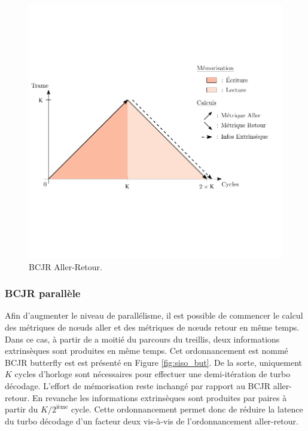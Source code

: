 \begin{figure}[!h]
	\centering
	\includegraphics{main/ch4_fig/ipe/FB+LEG.pdf}
	\caption{BCJR Aller-Retour. \label{fig:siso_seq}}
\end{figure}

\subsubsection{BCJR parallèle}
Afin d'augmenter le niveau de parallélisme, il est possible de commencer le calcul des métriques de nœuds aller et des
métriques de nœuds retour en même temps. Dans ce cas, à partir de a moitié du parcours du treillis, deux informations 
extrinsèques sont produites en même temps. Cet ordonnancement est nommé BCJR butterfly \cite{butterfly} est est présenté 
en Figure \ref{fig:siso_but}. De la sorte, uniquement $K$ cycles d'horloge sont nécessaires pour effectuer une 
demi-itération de turbo décodage. L'effort de mémorisation reste inchangé par rapport au BCJR aller-retour. En revanche 
les informations extrinsèques sont produites par paires à partir du $K/2^{\text{ième}}$ cycle. Cette ordonnancement 
permet donc de réduire la latence du turbo décodage d'un facteur deux vis-à-vis de l'ordonnancement aller-retour.

